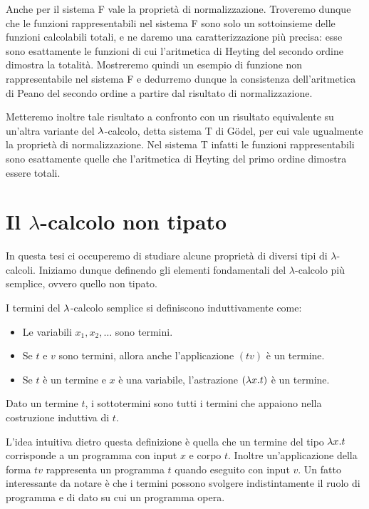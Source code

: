 \documentclass[]{marticle}
\begin{document}
Anche per il sistema F vale la propriet\`a di normalizzazione. Troveremo dunque
che le funzioni rappresentabili nel sistema F sono solo un sottoinsieme delle
funzioni calcolabili totali, e ne daremo una caratterizzazione pi\`u precisa:
esse sono esattamente le funzioni di cui l'aritmetica di Heyting del secondo
ordine dimostra la totalit\`a.  Mostreremo quindi un esempio di funzione non
rappresentabile nel sistema F e dedurremo dunque la consistenza dell'aritmetica
di Peano del secondo ordine a partire dal risultato di normalizzazione.

Metteremo inoltre tale risultato a confronto con un risultato equivalente su
un'altra variante del $\lambda$-calcolo, detta sistema T di G\"odel, per cui vale
ugualmente la propriet\`a di normalizzazione. Nel sistema T infatti le funzioni
rappresentabili sono esattamente quelle che l'aritmetica di Heyting del primo
ordine dimostra essere totali.

\section{Il $\lambda$-calcolo non tipato}

In questa tesi ci occuperemo di studiare alcune propriet\`a di diversi tipi
di $\lambda$-calcoli. Iniziamo dunque definendo gli elementi fondamentali del
$\lambda$-calcolo pi\`u semplice, ovvero quello non tipato.

\begin{block}[Definizione]
    I termini del $\lambda$-calcolo semplice si definiscono induttivamente come:
    \begin{itemize}
        \item Le variabili $x_1, x_2, \dots$ sono termini.
        \item Se $t$ e $v$ sono termini, allora anche l'applicazione $(tv)$ \`e
            un termine.
        \item Se $t$ \`e un termine e $x$ \`e una variabile, l'astrazione $(\lambda
            x.  t)$ \`e un termine.
    \end{itemize}

    Dato un termine $t$, i sottotermini sono tutti i termini che appaiono nella
    costruzione induttiva di $t$.
\end{block}

L'idea intuitiva dietro questa definizione \`e quella che un termine del tipo
$\lambda x.t$ corrisponde a un programma con input $x$ e corpo $t$. Inoltre
un'applicazione della forma $tv$ rappresenta  un programma $t$ quando eseguito
con input $v$. Un fatto interessante da notare \`e che i termini possono
svolgere indistintamente il ruolo di programma e di dato su cui un programma
opera.
\end{document}
